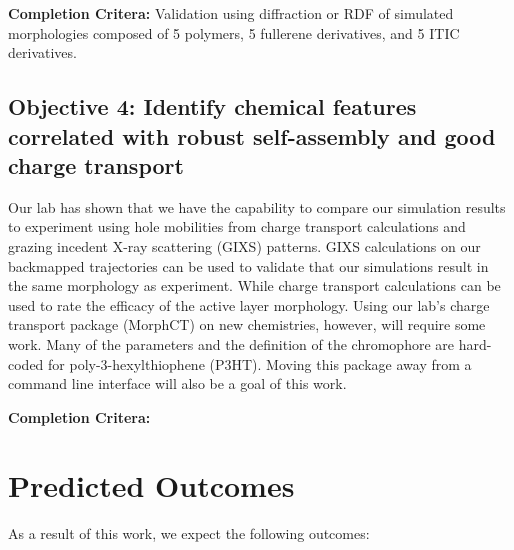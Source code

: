 \textbf{Completion Critera:} 
Validation using diffraction or RDF of simulated morphologies composed of 5 polymers, 5 fullerene derivatives, and 5 ITIC derivatives. 

\subsection*{Objective 4: Identify chemical features correlated with robust self-assembly and good charge transport}

Our lab has shown that we have the capability to compare our simulation results to experiment using hole mobilities from charge transport calculations\cite{Jones2017,Miller2018a} and grazing incedent X-ray scattering (GIXS) patterns\cite{Miller2018}.
GIXS calculations on our backmapped trajectories can be used to validate that our simulations result in the same morphology as experiment.
While charge transport calculations can be used to rate the efficacy of the active layer morphology.
Using our lab's charge transport package (MorphCT) on new chemistries, however, will require some work.
Many of the parameters and the definition of the chromophore are hard-coded for poly-3-hexylthiophene (P3HT).
Moving this package away from a command line interface will also be a goal of this work.

\textbf{Completion Critera:} 

\section*{Predicted Outcomes}

As a result of this work, we expect the following outcomes:


